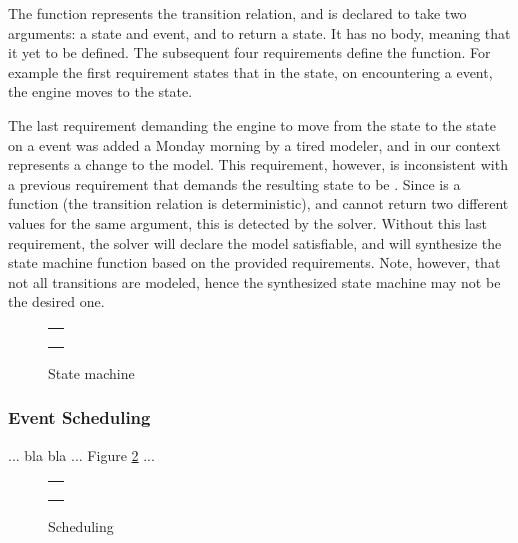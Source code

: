 The function  represents the transition relation, and 
is declared to take two arguments: a state and event, and to return a state. 
It has no body, meaning that it yet to be defined. The subsequent four  requirements define the 
 function. For example the first requirement states that
in the  state, on encountering a  event, the engine moves to the  state. 

The last requirement demanding the engine to move from the  state to the  state on a  event was added a Monday morning by a tired
modeler, and in our context represents a change to the model.
This requirement, however, is inconsistent with a previous requirement 
that demands the resulting state to be .
Since  is a function (the transition relation is deterministic), and cannot return two
different values for the same argument, this is detected by the solver. 
Without this last requirement, the solver will declare the model satisfiable, and will synthesize the state machine function based on the provided requirements.
Note, however, that not all transitions are modeled, hence the synthesized state
machine may not be the desired one.


\begin{figure}
\centering
\begin{tabular}{c}
\hline \\
 \\ \\
\hline
\end{tabular}
\caption{State machine}
\label{fig:statemachine}
\end{figure}

\subsubsection{Event Scheduling}

... bla bla ... Figure \ref{fig:scheduling} ...

\begin{figure}
\centering
\begin{tabular}{c}
\hline \\
 \\ \\
\hline
\end{tabular}
\caption{Scheduling}
\label{fig:scheduling}
\end{figure}

